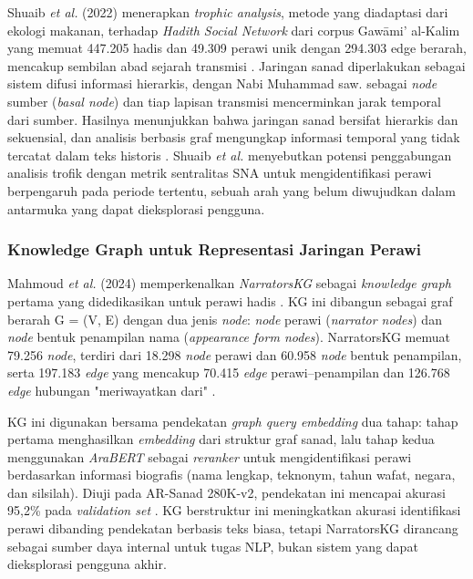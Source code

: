 Shuaib \textit{et al.} (2022) menerapkan \textit{trophic analysis}, metode yang diadaptasi dari ekologi makanan, terhadap \textit{Hadith Social Network} dari corpus Gawāmi' al-Kalim yang memuat 447.205 hadis dan 49.309 perawi unik dengan 294.303 edge berarah, mencakup sembilan abad sejarah transmisi \cite{Shuaib2022}. Jaringan sanad diperlakukan sebagai sistem difusi informasi hierarkis, dengan Nabi Muhammad saw. sebagai \textit{node} sumber (\textit{basal node}) dan tiap lapisan transmisi mencerminkan jarak temporal dari sumber. Hasilnya menunjukkan bahwa jaringan sanad bersifat hierarkis dan sekuensial, dan analisis berbasis graf mengungkap informasi temporal yang tidak tercatat dalam teks historis \cite{Shuaib2022}. Shuaib \textit{et al.} menyebutkan potensi penggabungan analisis trofik dengan metrik sentralitas SNA untuk mengidentifikasi perawi berpengaruh pada periode tertentu, sebuah arah yang belum diwujudkan dalam antarmuka yang dapat dieksplorasi pengguna.

\subsubsection{Knowledge Graph untuk Representasi Jaringan Perawi}

Mahmoud \textit{et al.} (2024) memperkenalkan \textit{NarratorsKG} sebagai \textit{knowledge graph} pertama yang didedikasikan untuk perawi hadis \cite{Mahmoud2024}. KG ini dibangun sebagai graf berarah G = (V, E) dengan dua jenis \textit{node}: \textit{node} perawi (\textit{narrator nodes}) dan \textit{node} bentuk penampilan nama (\textit{appearance form nodes}). NarratorsKG memuat 79.256 \textit{node}, terdiri dari 18.298 \textit{node} perawi dan 60.958 \textit{node} bentuk penampilan, serta 197.183 \textit{edge} yang mencakup 70.415 \textit{edge} perawi--penampilan dan 126.768 \textit{edge} hubungan "meriwayatkan dari" \cite{Mahmoud2024}.

KG ini digunakan bersama pendekatan \textit{graph query embedding} dua tahap: tahap pertama menghasilkan \textit{embedding} dari struktur graf sanad, lalu tahap kedua menggunakan \textit{AraBERT} sebagai \textit{reranker} untuk mengidentifikasi perawi berdasarkan informasi biografis (nama lengkap, teknonym, tahun wafat, negara, dan silsilah). Diuji pada AR-Sanad 280K-v2, pendekatan ini mencapai akurasi 95,2\% pada \textit{validation set} \cite{Mahmoud2024}. KG berstruktur ini meningkatkan akurasi identifikasi perawi dibanding pendekatan berbasis teks biasa, tetapi NarratorsKG dirancang sebagai sumber daya internal untuk tugas NLP, bukan sistem yang dapat dieksplorasi pengguna akhir.

